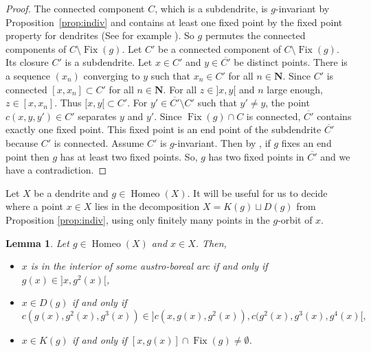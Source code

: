 \documentclass[JEP,XML,SOM,Unicode,NoFloatCountersInSection]{cedram}
\theoremstyle{plain}
\newtheorem{lem}[thm]{Lemma}
\theoremstyle{definition}
\newcommand{\NN}{\mathbf{N}}
\DeclareMathOperator{\Homeo}{Homeo}
\DeclareMathOperator{\Fix}{Fix}
\begin{document}
\begin{proof} The connected component $C$, which is a subdendrite, is $g$-invariant by Proposition~\ref{prop:indiv} and contains at least one fixed point by the fixed point property for dendrites (See for example \cite[Lem.\,2.5]{DM_dendrites}). So $g$ permutes the connected components of $C\setminus\Fix(g)$. Let $C'$ be a connected component of
$C\setminus\Fix(g)$. Its closure $C'$ is a subdendrite. Let $x\in C'$ and $y\in\overline{C'}$ be distinct points. There is a sequence $(x_n)$ converging to $y$ such that $x_n\in C'$ for all $n\in\NN$. Since $C'$ is connected $[x,x_n]\subset C'$ for all $n\in\NN$. For all $z\in{}]x,y[$ and $n$ large enough, $z\in [x,x_n]$. Thus $[x,y[{}\subset C'$. For $y' \in\overline{C'}\setminus C'$ such that $y'\neq y$, the point $c(x,y,y')\in C'$ separates $y$ and $y'$. Since $\Fix(g)\cap C$ is connected, $\overline{C'}$ contains exactly one fixed point. This fixed point is an end point of the subdendrite $\overline{C'}$ because $C'$ is connected. Assume $C'$ is $g$-invariant. Then by \cite[Lem.\,4.8]{DM_dendritesII}, if $g$ fixes an end point then $g$ has at least two fixed points. So, $g$ has two fixed points in $\overline{C'}$ and we have a contradiction. \end{proof}

Let $X$ be a dendrite and $g\in\Homeo(X)$. It will be useful for us to decide where a point $x\in X$ lies in the decomposition $X=K(g)\sqcup D(g)$ from Proposition \ref{prop:indiv}, using only finitely many points in the $g$-orbit of $x$.

\begin{lem}\label{lem:c}Let $g\in\Homeo(X)$ and $x\in X$. Then,
\begin{itemize}
\item $x$ is in the interior of some austro-boreal arc if and only if $g(x)\in{}]x,g^2(x)[$,
\item $x\in D(g)$ if and only if
\[
c(g(x),g^2(x),g^3(x))\in{}]c(x,g(x),g^2(x)),c(g^2(x),g^3(x),g^4(x)[,
\]

\item $x\in K(g)$ if and only if $[x,g(x)]\cap\Fix(g)\neq\emptyset$.
\end{itemize}
\end{lem}
\end{document}
